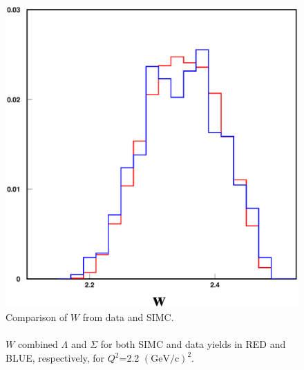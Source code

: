 \begin{figure}[!tbp]
  \centering
  \includegraphics[width=0.8\columnwidth]{com_plot_2_w_2}
  \caption[Comparison of $W$ from data and SIMC.]{\label{fig:com_plot_2_w_2}Comparison of $W$ from data and SIMC.\\\\ $W$ combined $\Lambda$ and $\Sigma$ for both SIMC and data yields in RED and BLUE, respectively, for $Q^2$=2.2 $(\mathrm{GeV/c})^2$.}
\end{figure}

